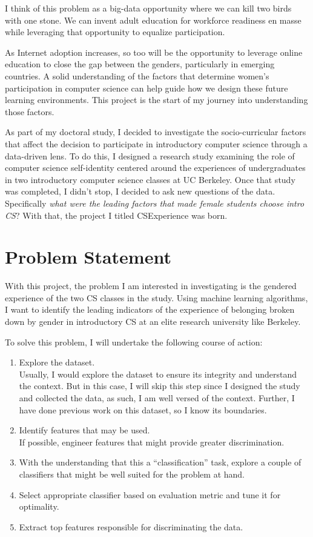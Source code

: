 I think of this problem as a big-data opportunity where we can kill two birds with one stone. We can invent adult education for workforce readiness en masse while leveraging that opportunity to equalize participation.

As Internet adoption increases, so too will be the opportunity to leverage online education to close the gap between the genders, particularly in emerging countries. A solid understanding of the factors that determine women's participation in computer science can help guide how we design these future learning environments.  This project is the start of my journey into understanding those factors.

As part of my doctoral study, I decided to investigate the socio-curricular factors that affect the decision to participate in introductory computer science through a data-driven lens. To do this, I designed a research study examining the role of computer science self-identity centered around the experiences of undergraduates in two introductory computer science classes at UC Berkeley. Once that study was completed, I didn't stop, I decided to ask new questions of the data. Specifically \textit{what were the leading factors that made female students choose intro CS}?  With that, the project I titled CSExperience was born. 


\section*{Problem Statement}

With this project, the problem I am interested in investigating is the gendered experience of the two CS classes in the study. Using machine learning algorithms, I want to identify the leading indicators of the experience of belonging broken down by gender in introductory CS at an elite research university like Berkeley.

To solve this problem, I will undertake the following course of action:
\begin{enumerate}%
\item Explore the dataset.\\
Usually, I would explore the dataset to ensure its integrity and understand the context. But in this case, I will skip this step since I designed the study and collected the data, as such, I am well versed of the context. Further, I have done previous work on this dataset, so I know its boundaries.
\item Identify features that may be used.\\ 
If possible, engineer features that might provide greater discrimination.
\item With the understanding that this a ``classification'' task, explore a couple of classifiers that might be well suited for the problem at hand.
\item Select appropriate classifier based on evaluation metric and tune it for optimality.
\item Extract top features responsible for discriminating the data.
\end{enumerate}

